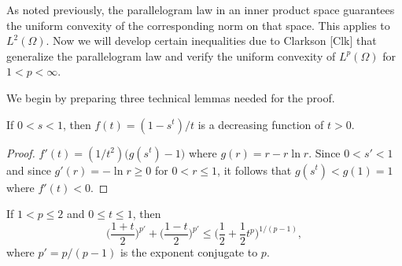 \setcounter{para}{33}

\begin{para}
  As noted previously, the parallelogram law in an inner product space guarantees
  the uniform convexity of the corresponding norm on that space.
  This applies to $L^2(\Omega)$. Now we will develop certain inequalities due to 
  Clarkson [Clk] that generalize the parallelogram law and verify the 
  uniform convexity of $L^p(\Omega)$ for $1 < p < \infty$.
\end{para}

We begin by preparing three technical lemmas needed for the proof.

\begin{lemma}
  If $0<s<1$, then $f(t) = (1-s^t)/t$ is a decreasing function of $t>0$.
\end{lemma}

\begin{proof}
  $f'(t) = (1/t^2)\bigl(g(s^t)-1\bigr)$ where $g(r) = r - r\ln r$.
  Since $0<s'<1$ and since $g'(r) = -\ln r \geq 0$ for $0<r\leq 1$,
  it follows that $g(s^t) < g(1) = 1$ where $f'(t)<0$.
\end{proof}


\begin{lemma}\label{lemma:2.36}
  If $1<p\leq 2$ and $0\leq t\leq 1$, then
  \begin{equation}\label{eq:2.25}
    \biggl(\frac{1+t}{2}\biggr)^{p'} + \biggl(\frac{1-t}{2}\biggr)^{p'}
    \leq \biggl(\frac12 + \frac12 t^p\biggr)^{1/(p-1)},
  \end{equation}
  where $p' = p/(p-1)$ is the exponent conjugate to $p$.
\end{lemma}


